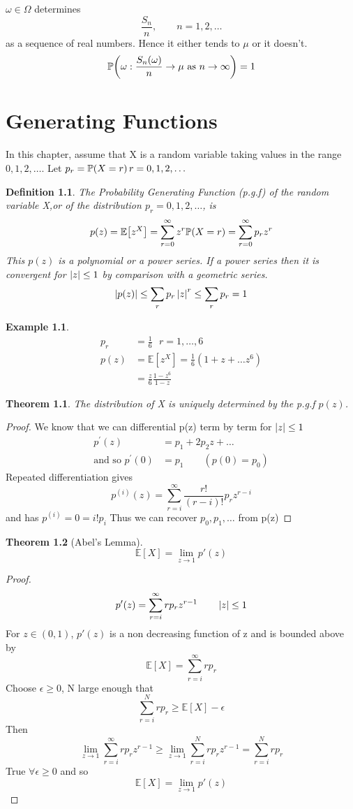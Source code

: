 \documentclass{notes}
\theoremstyle{plain}
\newtheorem{theorem}{Theorem}[chapter]
\newtheorem*{example}{Example}
\newtheorem{definition}{Definition}[chapter]
\newcommand{\bP}{\mathbb{P}}
\newcommand{\bE}{\mathbb{E}}
\newcommand{\prob}[1]{\bP \negthinspace\left(#1\right)}
\newcommand{\expect}[1]{\bE\!\left[#1\right]}
\begin{document}
$\omega \in \Omega$ determines 
\[
\frac{S_n}{n}, \qquad n=1,2,\dots
\]
as a sequence of real numbers. Hence it either tends to $\mu$ or it doesn't.
\[
\prob{\omega :\frac{S_n(\omega)}{n} \to \mu \text{ as } n\to\infty} = 1
\]
\chapter{Generating Functions}
In this chapter, assume that X is a random variable taking values in the 
range ${0,1,2,\dots}$. Let $p_r = \prob{X=r} r = 0,1,2,\dots$
\begin{definition}
The \emph{Probability Generating Function} (p.g.f) of the random variable
X,or of the distribution $p_r=0,1,2,\dots$, is
\[
p(z) = \expect{z^X} = \sum_{r=0}^\infty z^r\prob{X=r} 
= \sum_{r=0}^\infty p_r z^r
\]
This $p(z)$ is a polynomial or a power series. If a power series then it is
convergent for $\left|z\right| \leq 1$ by comparison with a geometric series.
\[
\left|p(z)\right| \leq \sum_r p_r \left|z\right|^r \leq\sum_r p_r = 1
\]
\end{definition}
\begin{example}
\begin{align*}
p_r &= \frac{1}{6} \text{ } r= 1,\dots,6\\
p(z) &= \expect{z^X} = \frac{1}{6}\left(1 + z + \dots z^6 \right)\\
&= \frac{z}{6}\frac{1-z^6}{1-z} 
\end{align*}
\end{example}
\begin{theorem}
The distribution of X is uniquely determined by the p.g.f $p(z)$.
\end{theorem}
\begin{proof}
We know that we can differential p(z) term by term for $\left|z\right| \le 1$
\begin{align*}
p^{'}(z) &= p_1 + 2p_2z + \dots \\
\text{and so } p^{'}(0) &= p_1 \qquad ( p(0) = p_0)
\end{align*}
Repeated differentiation gives
\[
p^{(i)}(z) = \sum_{r=i}^\infty \frac{r!}{(r-i)!}p_rz^{r-i}
\]
and has $p^{(i)} = 0 = i!p_i$ Thus we can recover $p_0,p_1,\dots$ from p(z)
\end{proof}
\begin{theorem}[Abel's Lemma]
\[
\expect{X} = \lim_{z\to 1} p'(z)
\]
\end{theorem}
\begin{proof}
\[
 p'(z) =  \sum_{r=i}^\infty r p_r z^{r-1} \qquad \left|z\right| \le 1
\]
For $z \in(0,1)$, $ p'(z)$ is a non decreasing function of z and is 
bounded above by
\[
\expect{X} =  \sum_{r=i}^\infty r p_r
\] 
Choose $\epsilon \ge 0$, N large enough that
\[
\sum_{r=i}^N r p_r \geq \expect{X} - \epsilon
\]
Then
\[
\lim_{z\to 1}\sum_{r=i}^\infty r p_rz^{r-1} \geq 
\lim_{z\to 1}\sum_{r=i}^N r p_r z^{r-1} = \sum_{r=i}^N r p_r
\]
True $\forall \epsilon \ge 0 $ and so 
\[
\expect{X} = \lim_{z\to 1} p'(z)
\] 
\end{proof}
\end{document}
